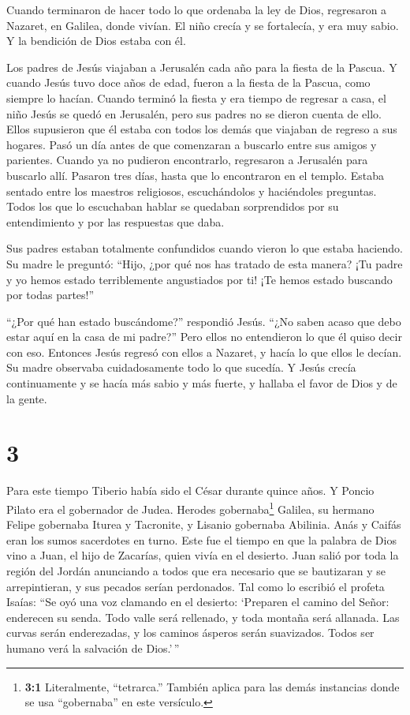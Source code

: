  Cuando terminaron de hacer todo lo que ordenaba la ley de
Dios, regresaron a Nazaret, en Galilea, donde vivían.  El
niño crecía y se fortalecía, y era muy sabio. Y la bendición de Dios
estaba con él.

 Los padres de Jesús viajaban a Jerusalén cada año para la
fiesta de la Pascua.  Y cuando Jesús tuvo doce años de
edad, fueron a la fiesta de la Pascua, como siempre lo hacían.
 Cuando terminó la fiesta y era tiempo de regresar a casa,
el niño Jesús se quedó en Jerusalén, pero sus padres no se dieron cuenta
de ello.  Ellos supusieron que él estaba con todos los
demás que viajaban de regreso a sus hogares. Pasó un día antes de que
comenzaran a buscarlo entre sus amigos y parientes.  Cuando
ya no pudieron encontrarlo, regresaron a Jerusalén para buscarlo allí.
 Pasaron tres días, hasta que lo encontraron en el templo.
Estaba sentado entre los maestros religiosos, escuchándolos y
haciéndoles preguntas.  Todos los que lo escuchaban hablar
se quedaban sorprendidos por su entendimiento y por las respuestas que
daba.

 Sus padres estaban totalmente confundidos cuando vieron lo
que estaba haciendo. Su madre le preguntó: ``Hijo, ¿por qué nos has
tratado de esta manera? ¡Tu padre y yo hemos estado terriblemente
angustiados por ti! ¡Te hemos estado buscando por todas partes!''

 ``¿Por qué han estado buscándome?'' respondió Jesús. ``¿No
saben acaso que debo estar aquí en la casa de mi padre?'' 
Pero ellos no entendieron lo que él quiso decir con eso. 
Entonces Jesús regresó con ellos a Nazaret, y hacía lo que ellos le
decían. Su madre observaba cuidadosamente todo lo que sucedía.
 Y Jesús crecía continuamente y se hacía más sabio y más
fuerte, y hallaba el favor de Dios y de la gente.

\hypertarget{section-2}{%
\section{3}\label{section-2}}

 Para este tiempo Tiberio había sido el César durante quince
años. Y Poncio Pilato era el gobernador de Judea. Herodes
gobernaba\footnote{\textbf{3:1} Literalmente, ``tetrarca.'' También
  aplica para las demás instancias donde se usa ``gobernaba'' en este
  versículo.} Galilea, su hermano Felipe gobernaba Iturea y Tacronite, y
Lisanio gobernaba Abilinia.  Anás y Caifás eran los sumos
sacerdotes en turno. Este fue el tiempo en que la palabra de Dios vino a
Juan, el hijo de Zacarías, quien vivía en el desierto.  Juan
salió por toda la región del Jordán anunciando a todos que era necesario
que se bautizaran y se arrepintieran, y sus pecados serían perdonados.
 Tal como lo escribió el profeta Isaías: ``Se oyó una voz
clamando en el desierto: `Preparen el camino del Señor: enderecen su
senda.  Todo valle será rellenado, y toda montaña será
allanada. Las curvas serán enderezadas, y los caminos ásperos serán
suavizados.  Todos ser humano verá la salvación de
Dios.'\,''

